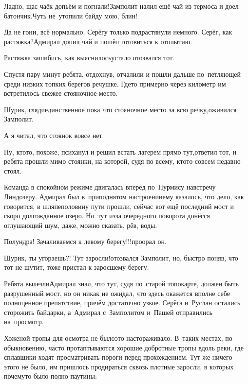 \diagdash Ладно, щас чаёк допьём и погнали!\mdash Замполит налил ещё чай из термоса и доел батончик.\mdash Чуть не~утопили байду мою, блин!

\diagdash Да не гони, всё нормально. Серёгу только подрастянули немного. Серёг, как растяжка?\mdash Адмирал допил чай и пошёл готовиться к отплытию.

\diagdash Растяжка зашибись, как выяснилось\myldots{}\mdash устало отозвался тот.

Спустя пару минут ребята, отдохнув, отчалили и пошли дальше по~петляющей среди низких топких берегов речушке. Где\sdash то примерно через километр им встретилось свежее стояночное место.

\diagdash Шурик, гляди\mdash единственное пока что стояночное место за всю речку,\mdash оживился Замполит.

\diagdash А я читал, что стоянок вовсе нет.

\diagdash Ну, кто\sdash то, похоже, психанул и решил встать лагерем прямо тут,\mdash ответил тот, и ребята прошли мимо стоянки, на которой, судя по всему, кто\sdash то совсем недавно стоял.

Команда в спокойном режиме двигалась вперёд по~Нурмису навстречу Линдозеру. Адмирал был в~приподнятом настроении\mdash ему казалось, что дело, как говорится, в шляпе\mdash половину пути прошли, сейчас вот ещё последний мост и скоро долгожданное озеро. Но~тут из\sdash за очередного поворота донёсся оглушающий шум, даже, можно сказать, рёв, воды.

\diagdash Полундра! Зачаливаемся к левому берегу!!!\mdash проорал он.

\diagdash Шурик, ты угораешь?! Тут заросли!\mdash отозвался Замполит, но, быстро поняв, что тот не шутит, тоже пристал к заросшему берегу.

Ребята вылезли\mdash Адмирал знал, что тут, судя по~старой топокарте, должен быть разрушенный мост, но он никак не ожидал, что здесь окажется вполне себе полноценное препятствие, причём достаточно узкое. Серёга и~Руслан остались сторожить байдарки, а~Адмирал с~Замполитом и~Пашей отправились на~просмотр. 

Хоженой тропы для осмотра не было\mdash это настораживало. В~таких местах, по обыкновению, часто протаптываются хорошие добротные тропы вдоль реки, где сплавщики ходят просматривать пороги перед прохождением. Тут же ничего этого не было, им пришлось продираться сквозь плотные заросли, в которых почему\sdash то было полно паутины:


